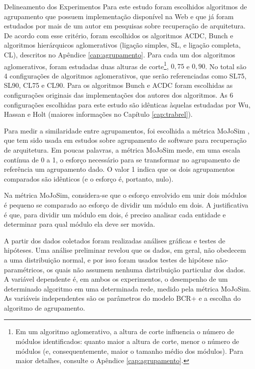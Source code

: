 \begin{section}{Delineamento dos Experimentos}
	Para este estudo foram escolhidos algoritmos de agrupamento que possuem implementação disponível na Web e que já foram estudados por mais de um autor em pesquisas sobre recuperação de arquitetura. De acordo com esse critério, foram escolhidos os algoritmos ACDC, Bunch e algoritmos hierárquicos aglomerativos (ligação simples, SL, e ligação completa, CL), descritos no Apêndice \ref{cap:agrupamento}. Para cada um dos algoritmos aglomerativos, foram estudadas duas alturas de corte\footnote{Em um algoritmo aglomerativo, a altura de corte influencia o número de módulos identificados: quanto maior a altura de corte, menor o número de módulos (e, consequentemente, maior o tamanho médio dos módulos). Para maior detalhes, consulte o Apêndice \ref{cap:agrupamento}.}, $0,75$ e $0,90$. No total são 4 configurações de algoritmos aglomerativos, que serão referenciadas como SL75, SL90, CL75 e CL90. Para os algoritmos Bunch e ACDC foram escolhidas as configurações originais das implementações dos autores dos algoritmos. As 6 configurações escolhidas para este estudo são idênticas àquelas estudadas por Wu, Hassan e Holt \cite{Wu2005} (maiores informações no Capítulo \ref{cap:trabrel}).
	
	Para medir a similaridade entre agrupamentos, foi escolhida a métrica MoJoSim \cite{Tzerpos1999,Bittencourt2009}, que tem sido usada em estudos sobre agrupamento de software para recuperação de arquitetura. Em poucas palavras, a métrica MoJoSim mede, em uma escala contínua de 0 a 1, o esforço necessário para se transformar no agrupamento de referência um agrupamento dado. O valor 1 indica que os dois agrupamentos comparados são idênticos (e o esforço é, portanto, nulo). 
	
	Na métrica MoJoSim, considera-se que o esforço envolvido em unir dois módulos é pequeno se comparado ao esforço de dividir um módulo em dois. A justificativa é que, para dividir um módulo em dois, é preciso analisar cada entidade e determinar para qual módulo ela deve ser movida.


	A partir dos dados coletados foram realizadas análises gráficas e testes de hipóteses. Uma análise preliminar revelou que os dados, em geral, não obedecem a uma distribuição normal, e por isso foram usados testes de hipótese não-paramétricos, os quais não assumem nenhuma distribuição particular dos dados. A variável dependente é, em ambos os experimentos, o desempenho de um determinado algoritmo em uma determinada rede, medido pela métrica MoJoSim. As variáveis independentes são os parâmetros do modelo BCR+ e a escolha do algoritmo de agrupamento.
	

\end{section}
